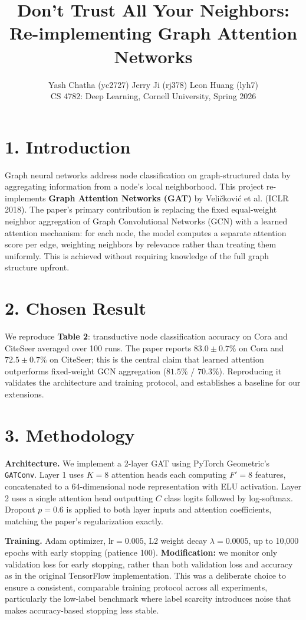 \documentclass[11pt]{article}
\title{\vspace{-1.5em}\textbf{Don't Trust All Your Neighbors: Re-implementing Graph Attention Networks}\vspace{-0.5em}}
\author{Yash Chatha (yc2727) \quad Jerry Ji (rj378) \quad Leon Huang (lyh7) \\
\small CS 4782: Deep Learning, Cornell University, Spring 2026}
\date{\vspace{-1em}}
\begin{document}
\maketitle
\vspace{-1em}

\section*{1. Introduction}

Graph neural networks address node classification on graph-structured data by aggregating information from a node's local neighborhood. This project re-implements \textbf{Graph Attention Networks (GAT)} by Veli\v{c}kovi\'{c} et al. (ICLR 2018). The paper's primary contribution is replacing the fixed equal-weight neighbor aggregation of Graph Convolutional Networks (GCN) with a learned attention mechanism: for each node, the model computes a separate attention score per edge, weighting neighbors by relevance rather than treating them uniformly. This is achieved without requiring knowledge of the full graph structure upfront.

\section*{2. Chosen Result}

We reproduce \textbf{Table 2}: transductive node classification accuracy on Cora and CiteSeer averaged over 100 runs. The paper reports $83.0 \pm 0.7\%$ on Cora and $72.5 \pm 0.7\%$ on CiteSeer; this is the central claim that learned attention outperforms fixed-weight GCN aggregation ($81.5\%$ / $70.3\%$). Reproducing it validates the architecture and training protocol, and establishes a baseline for our extensions.

\section*{3. Methodology}

\textbf{Architecture.} We implement a 2-layer GAT using PyTorch Geometric's \texttt{GATConv}. Layer 1 uses $K=8$ attention heads each computing $F'=8$ features, concatenated to a 64-dimensional node representation with ELU activation. Layer 2 uses a single attention head outputting $C$ class logits followed by log-softmax. Dropout $p=0.6$ is applied to both layer inputs and attention coefficients, matching the paper's regularization exactly.

\textbf{Training.} Adam optimizer, $\text{lr}=0.005$, L2 weight decay $\lambda=0.0005$, up to 10,000 epochs with early stopping (patience 100). \textbf{Modification:} we monitor only validation loss for early stopping, rather than both validation loss and accuracy as in the original TensorFlow implementation. This was a deliberate choice to ensure a consistent, comparable training protocol across all experiments, particularly the low-label benchmark where label scarcity introduces noise that makes accuracy-based stopping less stable.
\end{document}
